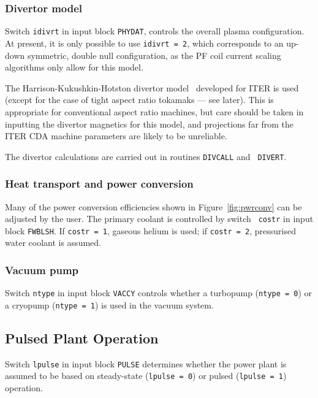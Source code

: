 \documentclass[11pt,a4paper]{report}
\begin{document}
\subsubsection{Divertor model}
\label{sec:divmod}

Switch {\tt idivrt} in input block {\tt PHYDAT}, controls the overall plasma
configuration. At present, it is only possible to use {\tt idivrt = 2}, which
corresponds to an up-down symmetric, double null configuration, as the PF coil
current scaling algorithms only allow for this model.
\setlength{\parskip}{5mm}

The Harrison-Kukushkin-Hotston divertor model~\cite{IPDG} developed for ITER
is used (except for the case of tight aspect ratio tokamaks --- see
later). This is appropriate for conventional aspect ratio machines, but care
should be taken in inputting the divertor magnetics for this model, and
projections far from the ITER CDA machine parameters are likely to be
unreliable.

The divertor calculations are carried out in routines {\tt DIVCALL} and {\tt
DIVERT}.
\setlength{\parskip}{0mm}

\subsubsection{Heat transport and power conversion}

Many of the power conversion efficiencies shown in Figure~\ref{fig:pwrconv}
can be adjusted by the user. The primary coolant is controlled by switch {\tt
costr} in input block {\tt FWBLSH}.  If {\tt costr = 1}, gaseous helium is
used; if {\tt costr = 2}, pressurised water coolant is assumed.

\subsubsection{Vacuum pump}

Switch {\tt ntype} in input block {\tt VACCY} controls whether a turbopump
({\tt ntype = 0}) or a cryopump ({\tt ntype = 1}) is used in the vacuum
system.

\subsection{Pulsed Plant Operation}

Switch {\tt lpulse} in input block {\tt PULSE} determines whether the power
plant is assumed to be based on steady-state ({\tt lpulse = 0}) or
pulsed ({\tt lpulse = 1}) operation.
\setlength{\parskip}{5mm}
\end{document}
